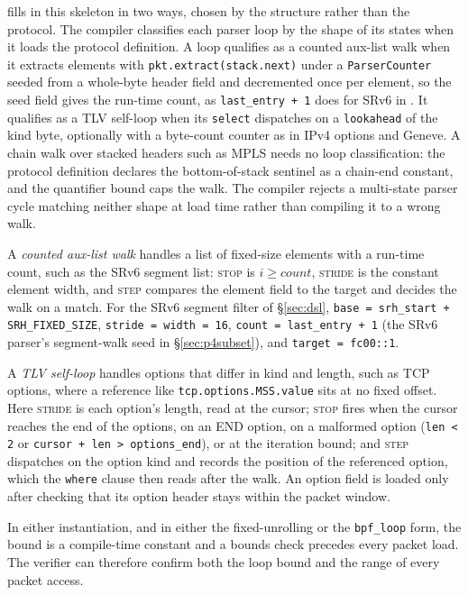 \kunai fills in this skeleton in two ways, chosen by the structure
rather than the protocol. The compiler classifies each parser loop by
the shape of its states when it loads the protocol definition. A loop
qualifies as a counted aux-list walk
when it extracts elements with \texttt{pkt.extract(stack.next)} under
a \texttt{ParserCounter} seeded from a whole-byte header field and
decremented once per element, so the seed field gives the run-time
count, as \texttt{last\_entry + 1} does for SRv6 in
. It qualifies as a TLV self-loop when its
\texttt{select} dispatches on a \texttt{lookahead} of the kind byte,
optionally with a byte-count counter as in IPv4 options and Geneve. A
chain walk over stacked headers such as MPLS needs no loop
classification: the protocol definition declares the bottom-of-stack
sentinel as a chain-end constant, and the quantifier bound caps the
walk. The compiler rejects a multi-state parser cycle matching
neither shape at load time rather than compiling it to a wrong walk.

A \emph{counted aux-list walk} handles a list
of fixed-size elements with a run-time count, such as the SRv6 segment
list: \textsc{stop} is $i \geq count$, \textsc{stride} is the constant
element width, and \textsc{step} compares the element field to the
target and decides the walk on a match. For the SRv6 segment filter of
\S\ref{sec:dsl}, \texttt{base = srh\_start + SRH\_FIXED\_SIZE},
\texttt{stride = width = 16}, \texttt{count = last\_entry + 1} (the SRv6
parser's segment-walk seed in \S\ref{sec:p4subset}), and
\texttt{target = fc00::1}.

A \emph{TLV self-loop} handles options that differ in kind and length,
such as TCP options, where a reference like
\texttt{tcp.\allowbreak options.\allowbreak MSS.\allowbreak value} sits
at no fixed offset. Here \textsc{stride} is each option's length,
read at the cursor; \textsc{stop} fires when the cursor reaches the end
of the options, on an END option, on a malformed option (\texttt{len < 2}
or \texttt{cursor + len > options\_end}), or at the iteration bound; and
\textsc{step} dispatches on the option kind and records the position of
the referenced option, which the \texttt{where} clause then reads after
the walk. An option field is loaded only after checking that its option
header stays within the packet window.

In either instantiation, and in either the fixed-unrolling or the
\texttt{bpf\_loop} form, the bound is a compile-time constant and a
bounds check precedes every packet load. The verifier can therefore
confirm both the loop bound and the range of every packet access.

